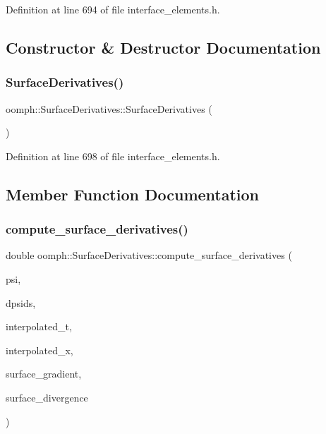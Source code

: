 Definition at line 694 of file interface\+\_\+elements.\+h.



\subsection{Constructor \& Destructor Documentation}
\mbox{\label{classoomph_1_1SurfaceDerivatives_a7bd520c805a4444073f5b05501d747fd}} 
\subsubsection{\texorpdfstring{Surface\+Derivatives()}{SurfaceDerivatives()}}
{\footnotesize\ttfamily oomph\+::\+Surface\+Derivatives\+::\+Surface\+Derivatives (\begin{DoxyParamCaption}{ }\end{DoxyParamCaption})\hspace{0.3cm}{\ttfamily [inline]}}



Definition at line 698 of file interface\+\_\+elements.\+h.



\subsection{Member Function Documentation}
\mbox{\label{classoomph_1_1SurfaceDerivatives_a44e841bfa4ad82dcb87e672c821ffde7}} 
\subsubsection{\texorpdfstring{compute\+\_\+surface\+\_\+derivatives()}{compute\_surface\_derivatives()}}
{\footnotesize\ttfamily double oomph\+::\+Surface\+Derivatives\+::compute\+\_\+surface\+\_\+derivatives (\begin{DoxyParamCaption}\item[{const Shape \&}]{psi,  }\item[{const D\+Shape \&}]{dpsids,  }\item[{const Dense\+Matrix$<$ double $>$ \&}]{interpolated\+\_\+t,  }\item[{const Vector$<$ double $>$ \&}]{interpolated\+\_\+x,  }\item[{D\+Shape \&}]{surface\+\_\+gradient,  }\item[{D\+Shape \&}]{surface\+\_\+divergence }\end{DoxyParamCaption})\hspace{0.3cm}{\ttfamily [protected]}}



